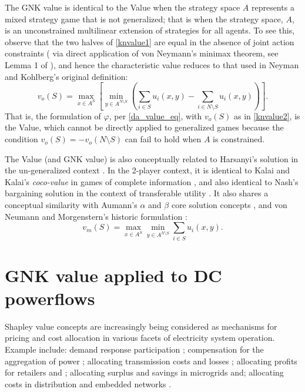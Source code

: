 The GNK value is identical to the Value \cite{value2} when the strategy space $A$ represents a mixed strategy game that is not generalized; 
that is when the strategy space, $A$, is an unconstrained multilinear extension of strategies for all agents.
To see this, observe that the two halves of \eqref{knvalue1} are equal in the absence of joint action constraints (%
via direct application of von Neymann's minimax theorem, see Lemma 1 of \cite{value2}), 
and hence the characteristic value reduces to that used in Neyman and Kohlberg's original definition:
\begin{equation}\label{knvalue2}
v_o(S) 
= \max_{x\in A^S} \left[ \min_{y\in A^{N\setminus S}} 
\left(\sum_{i\in S} u_i(x,y) - \sum_{i\in N\setminus S} u_i(x,y) 
\right) \right].\end{equation}
%
That is, the formulation of $\varphi$, per \eqref{da_value_eq}, 
with $v_o(S)$ as in \eqref{knvalue2},
is the Value, which cannot be directly applied to generalized games because the condition $v_o(S)=-v_o(N\setminus S)$ can fail to hold when $A$ is constrained. 

The Value (and GNK value) is also conceptually related to Harsanyi's solution in the un-generalized context \cite{values3}.
In the 2-player context, it is identical to Kalai and Kalai's \textit{coco-value} in games of complete information \cite{kalai1,Kalai2010,value2}, 
and also identical to Nash's bargaining solution in the context of transferable utility \cite{nash2,value2}.
It also shares a conceptual similarity with Aumann's $\alpha$ and $\beta$ core solution concepts \cite{aumann1961core}, and von Neumann and Morgenstern's historic formulation \cite{1944,KOHLBERG2018139,values3}:
\begin{equation}\label{knvalue3}v_m(S) = \max_{x\in A^S}\min_{y\in A^{N\setminus S}} \sum_{i\in S} u_i(x,y).\end{equation}

\section{GNK value applied to DC powerflows}\label{more_involved}

Shapley value concepts are increasingly being considered as mechanisms for pricing and cost allocation in various facets of electricity system operation.
Example include: demand response participation \cite{DBLP:journals/tsg/OBrienGR15,electronics8010048,WANG201972}; 
compensation for the aggregation of power \cite{Perez-Diaz:2018:CEV:3237383.3237484,6520960};
allocating transmission costs and losses \cite{ip-gtd_20020005,SHARMA201733}; allocating profits for retailers and \cite{ACUNA2018161,WANG201972}; 
allocating surplus and savings in microgrids \cite{WU2017384} and; 
allocating costs in distribution and embedded networks \cite{archie_paper1,8226810,10.1007/978-3-642-40776-5_19,6840296,DBLP:journals/corr/abs-1903-10965,AzuatalamCV_PowerTech2019}.

